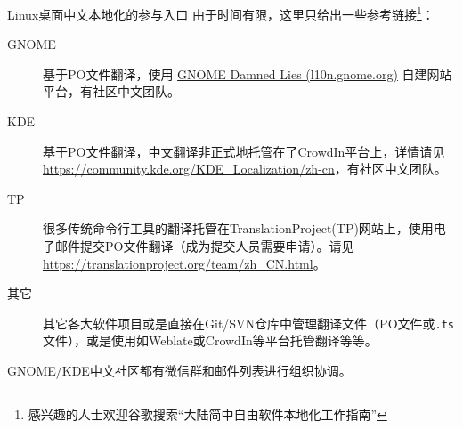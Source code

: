 
\begin{frame}{Linux桌面中文本地化的参与入口}
    由于时间有限，这里只给出一些参考链接\footnote{感兴趣的人士欢迎谷歌搜索“大陆简中自由软件本地化工作指南”}：
    \begin{description}
    	\item[GNOME] 基于PO文件翻译，使用 \href{https://l10n.gnome.org}{GNOME Damned Lies (l10n.gnome.org)} 自建网站平台，有社区中文团队。
    	\item[KDE] 基于PO文件翻译，中文翻译非正式地托管在了CrowdIn平台上，详情请见 \href{https://community.kde.org/KDE\_Localization/zh-cn}{https://community.kde.org/KDE\_Localization/zh-cn}，有社区中文团队。
    	\item[TP] 很多传统命令行工具的翻译托管在TranslationProject(TP)网站上，使用电子邮件提交PO文件翻译（成为提交人员需要申请）。请见 \href{https://translationproject.org/team/zh\_CN.html}{https://translationproject.org/team/zh\_CN.html}。
    	\item[其它] 其它各大软件项目或是直接在Git/SVN仓库中管理翻译文件（PO文件或\texttt{.ts}文件），或是使用如Weblate或CrowdIn等平台托管翻译等等。
    \end{description}

    GNOME/KDE中文社区都有微信群和邮件列表进行组织协调。
\end{frame}